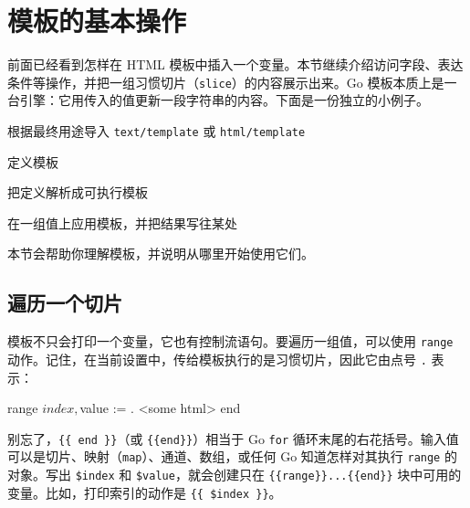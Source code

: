\section{模板的基本操作}

前面已经看到怎样在 HTML 模板中插入一个变量。本节继续介绍访问字段、表达条件等操作，并把一组习惯切片（\texttt{slice}）的内容展示出来。Go 模板本质上是一台引擎：它用传入的值更新一段字符串的内容。下面是一份独立的小例子。


\begin{codeannotations}
\item 根据最终用途导入 \texttt{text/template} 或 \texttt{html/template}
\item 定义模板
\item 把定义解析成可执行模板
\item 在一组值上应用模板，并把结果写往某处
\end{codeannotations}

本节会帮助你理解模板，并说明从哪里开始使用它们。

\subsection{遍历一个切片}

模板不只会打印一个变量，它也有控制流语句。要遍历一组值，可以使用 \texttt{range} 动作。记住，在当前设置中，传给模板执行的是习惯切片，因此它由点号 \texttt{.} 表示：

\begin{htmlcode}[]
{{ range $index, $value := . }} <some html> {{ end }}
\end{htmlcode}

别忘了，\texttt{\{\{ end \}\}}（或 \texttt{\{\{end\}\}}）相当于 Go \texttt{for} 循环末尾的右花括号。输入值可以是切片、映射（\texttt{map}）、通道、数组，或任何 Go 知道怎样对其执行 \texttt{range} 的对象。写出 \texttt{\$index} 和 \texttt{\$value}，就会创建只在 \texttt{\{\{range\}\}...\{\{end\}\}} 块中可用的变量。比如，打印索引的动作是 \texttt{\{\{ \$index \}\}}。

